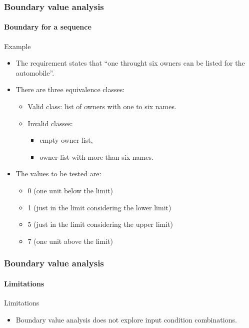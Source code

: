 \begin{frame}
\frametitle{Boundary value analysis}
\framesubtitle{Boundary for a sequence}

\begin{block}{Example}
\begin{itemize}
	\item The requirement states that ``one throught six owners can be listed
	for the automobile''.

	\item There are three equivalence classes:
	\begin{itemize}
		\item Valid class: list of owners with one to six names.
		\item Invalid classes:
		\begin{itemize}
			\item empty owner list,
			\item owner list with more than six names.
		\end{itemize}
	\end{itemize}

		\item The values to be tested are:
	\begin{itemize}
		\item 0 (one unit below the limit)
		\item 1 (just in the limit considering the lower limit)
		\item 5 (just in the limit considering the upper limit)
		\item 7 (one unit above the limit)
	\end{itemize}
\end{itemize}
\end{block}
\end{frame}


\begin{frame}[hasprev=true, hasnext=false]
\frametitle{Boundary value analysis}
\framesubtitle{Limitations}

\begin{block:fact}{Limitations}
\begin{itemize}
	\item Boundary value analysis does not explore input condition combinations.
\end{itemize}
\end{block:fact}
\end{frame}